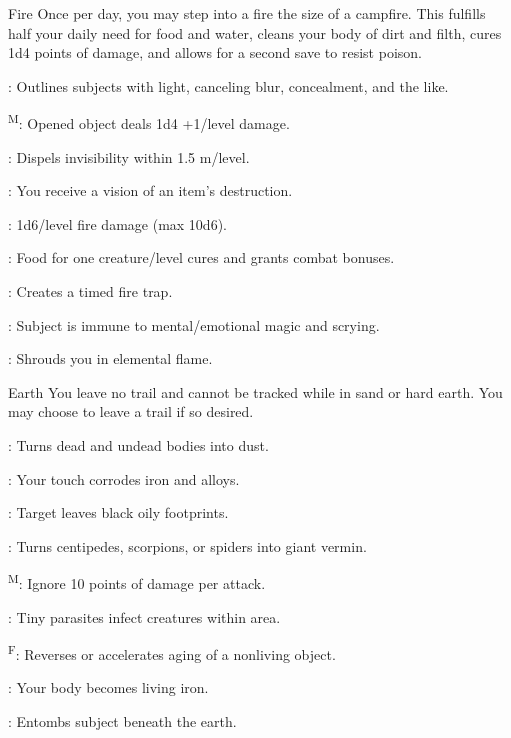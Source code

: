 {Fire}
{Once per day, you may step into a fire the size of a campfire. This fulfills half your daily need for food and water, cleans your body of dirt and filth, cures 1d4 points of damage, and allows for a second save to resist poison.}
{
	\item {}: Outlines subjects with light, canceling blur, concealment, and the like.
	\item {}\textsuperscript{M}: Opened object deals 1d4 +1/level damage.
	\item {}: Dispels invisibility within 1.5 m/level.
	\item {}: You receive a vision of an item's destruction.
	\item {}: 1d6/level fire damage (max 10d6).
	\item {}: Food for one creature/level cures and grants combat bonuses.
	\item {}: Creates a timed fire trap.
	\item {}: Subject is immune to mental/emotional magic and scrying.
	\item {}: Shrouds you in elemental flame.
}

{Earth}
{You leave no trail and cannot be tracked while in sand or hard earth. You may choose to leave a trail if so desired.}
{
	\item {}: Turns dead and undead bodies into dust.
	\item {}: Your touch corrodes iron and alloys.
	\item {}: Target leaves black oily footprints.
	\item {}: Turns centipedes, scorpions, or spiders into giant vermin.
	\item {}\textsuperscript{M}: Ignore 10 points of damage per attack.
	\item {}: Tiny parasites infect creatures within area.
	\item {}\textsuperscript{F}: Reverses or accelerates aging of a nonliving object.
	\item {}: Your body becomes living iron.
	\item {}: Entombs subject beneath the earth.
}

